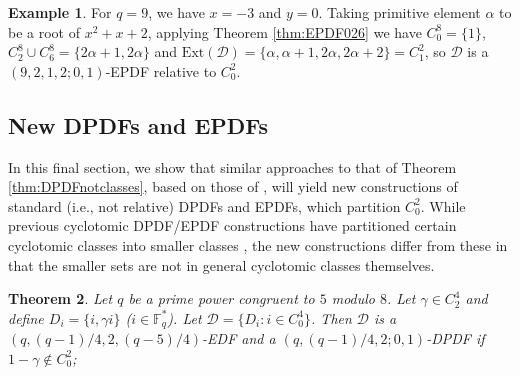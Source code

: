 \documentclass[12pt, a4paper]{article}
\newtheorem{theorem}{Theorem}[section]
\theoremstyle{definition}
\newtheorem{example}[theorem]{Example}
\begin{document}
\begin{example}
For $q=9$, we have $x=-3$ and $y=0$.  Taking primitive element $\alpha$ to be a root of $x^2+x+2$, applying Theorem \ref{thm:EPDF026} we have $C_0^8=\{1\}$, $C_2^8 \cup C_6^8=\{2\alpha+1,2\alpha\}$ and $\mathrm{Ext}(\mathcal{D})=\{\alpha,\alpha+1,2\alpha, 2\alpha+2\}=C_1^2$, so $\mathcal{D}$ is a $(9,2,1,2;0,1)$-EPDF relative to $C_0^2$.
\end{example}


\subsection{New DPDFs and EPDFs}
In this final section, we show that similar approaches to that of Theorem \ref{thm:DPDFnotclasses}, based on those of \cite{ChaDin}, will yield new constructions of standard (i.e., not relative) DPDFs and EPDFs, which partition $C_0^2$.  While previous cyclotomic DPDF/EPDF constructions have partitioned certain cyclotomic classes into smaller classes \cite{HucJoh}, the new constructions differ from these in that the smaller sets are not in general cyclotomic classes themselves.

	
\begin{theorem}\label{thm:q5mod8epdf}
	Let $q$ be a prime power congruent to $5$ modulo $8$.  
	Let $\gamma \in C_2^4$ and define $D_i=\{i,\gamma i\}$ ($i \in \mathbb{F}_q^*$). Let $\mathcal{D}=\{D_i: i \in C_0^4\}$. Then $\mathcal{D}$ is
	 a $(q,(q-1)/4,2,(q-5)/4)$-EDF and a $(q,(q-1)/4,2;0,1)$-DPDF if $1-\gamma \notin C_0^2$;
		\end{theorem}
\end{document}
